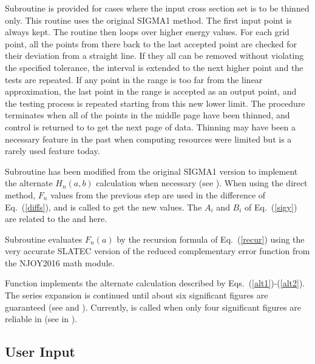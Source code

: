 Subroutine  is provided
for cases where the input cross section set is to be thinned only.
 This routine uses the original SIGMA1 method.  The
first input point is always kept.  The routine then loops over
higher energy values.  For each grid point, all the points from
there back to the last accepted point are checked for their
deviation from a straight line.  If they all can be removed
without violating the specified tolerance, the interval is
extended to the next higher point and the tests are
repeated.  If any point in the range is too far from the linear
approximation, the last point in the range is accepted as an
output point, and the testing process is repeated starting from
this new lower limit.  The procedure terminates when all of the
points in the middle page have been thinned, and control is
returned to  to get
the next page of data.  Thinning may have been a necessary
feature in the past when computing resources were limited but
is a rarely used feature today.

Subroutine  has been modified
from the original SIGMA1 version to implement the alternate
$H_n(a,b)$ calculation when necessary (see
).  When using the direct
method, $F_n$ values from the previous step are used in the
difference of Eq.~(\ref{diffs}), and  is called to
get the new values.  The $A_i$ and $B_i$ of Eq.~(\ref{sigy}) are
related to the  and  here.

Subroutine  evaluates
$F_n(a)$ by the recursion formula of Eq.~(\ref{recur}) using
the very accurate SLATEC version of
the reduced complementary error function
 from the NJOY2016
math module.

Function  implements the
alternate calculation described by Eqs.~(\ref{alt1})-(\ref{alt2}).
The series expansion is continued until about six significant figures
are guaranteed (see  and ).  Currently,
 is called when only four significant figures are
reliable in  (see  in ).

\subsection{User Input}
\label{ssBROADR_inp}

